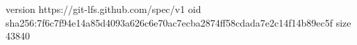 version https://git-lfs.github.com/spec/v1
oid sha256:7f6c7f94e14a85d4093a626c6e70ac7ecba2874ff58cdada7e2c14f14b89ec5f
size 43840
